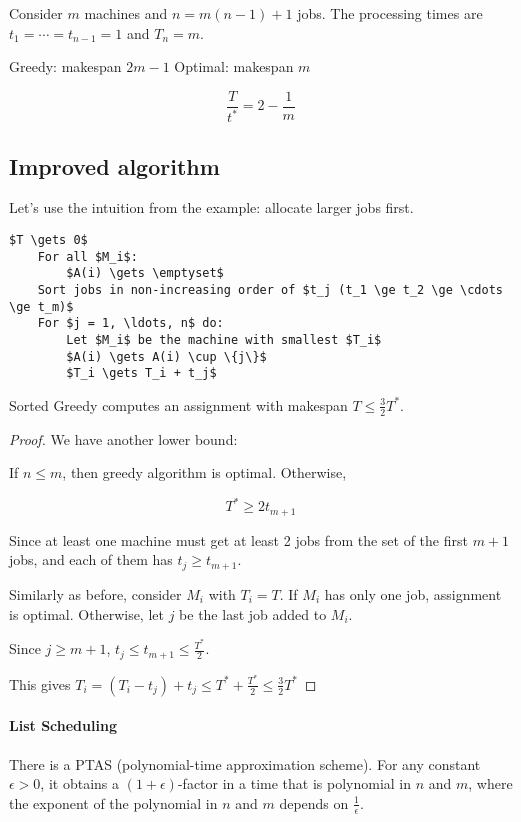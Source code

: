 Consider $m$ machines and $n = m(n-1) +1$ jobs. The processing times are $t_1 = \cdots = t_{n-1} = 1$ and $T_n = m$.

Greedy: makespan $2m -1$
Optimal: makespan $m$

$$\frac{T}{t^*} = 2 - \frac{1}{m}$$

\subsection{Improved algorithm}

Let's use the intuition from the example: allocate larger jobs first.

\begin{lstlisting}[mathescape]
    $T \gets 0$
    For all $M_i$:
        $A(i) \gets \emptyset$
    Sort jobs in non-increasing order of $t_j (t_1 \ge t_2 \ge \cdots \ge t_m)$
    For $j = 1, \ldots, n$ do:
        Let $M_i$ be the machine with smallest $T_i$
        $A(i) \gets A(i) \cup \{j\}$
        $T_i \gets T_i + t_j$
\end{lstlisting}

\begin{mytheorem}
Sorted Greedy computes an assignment with makespan $T \le \frac{3}{2} T^*$.
\end{mytheorem}
\begin{proof}
We have another lower bound:

If $n \le m$, then greedy algorithm is optimal. Otherwise, 

$$T^* \ge 2 t_{m+1}$$

Since at least one machine must get at least 2 jobs from the set of the first $m+1$ jobs, and each of them has $t_j \ge t_{m+1}$.

Similarly as before, consider $M_i$ with $T_i = T$.
If $M_i$ has only one job, assignment is optimal. Otherwise, let $j$ be the last job added to $M_i$.

Since $j \ge m+1$, $t_j \le t_{m+1} \le \frac{T^*}{2}$.

This gives $T_i = (T_i - t_j) + t_j \le T^* + \frac{T^*}{2} \le \frac{3}{2} T^*$
\end{proof}

\paragraph{List Scheduling} There is a PTAS (polynomial-time approximation scheme). For any constant $\epsilon > 0$, it obtains a $(1 + \epsilon)$-factor in a time that is polynomial in $n$ and $m$, where the exponent of the polynomial in $n$ and $m$ depends on $\frac{1}{\epsilon}$.


